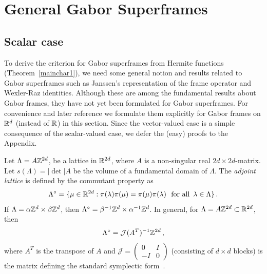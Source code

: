 \documentclass[12pt]{amsart}
\begin{document}
\section{General Gabor Superframes}
 


  \subsection{Scalar case}

To derive the criterion for Gabor superframes from Hermite  functions
(Theorem~\ref{mainchar1}), we need some general notion and results 
related  to  Gabor superframes
such as  Janssen's  representation of the frame operator and  Wexler-Raz
identities.  Although these are among the fundamental  
results about Gabor frames, they have not yet been formulated  for
Gabor superframes. For convenience and  later reference we formulate
them explicitly for Gabor frames on $\mathbb{R} ^d $ (instead of $\mathbb{R} $) in this 
section. Since the vector-valued case is   a simple consequence of the
scalar-valued case, we defer the (easy) proofs to the Appendix.  

\medskip
 
Let $\Lambda = A \mathbb{Z} ^{2d}$,  be a lattice in $\mathbb{R} ^{2d}$, where $A$
is a non-singular real  $2d \times 2d$-matrix. Let $s(\Lambda )
= |\det| A$ be  the volume of a fundamental domain of $\Lambda$.
The  {\em adjoint lattice} is defined by the commutant property  as 
\begin{equation}
  \label{eq:c2}
  \Lambda ^\circ = \{ \mu \in \mathbb{R} ^{2d}: \pi (\lambda ) \pi (\mu ) =
  \pi (\mu ) \pi (\lambda ) \,\, \text{ for all } \, \lambda \in
  \Lambda \}\, .
\end{equation}
 If $\Lambda = \alpha \mathbb{Z} ^d \times \beta \mathbb{Z} ^d$, then $\Lambda
^\circ = \beta ^{-1} \mathbb{Z} ^d \times \alpha ^{-1} \mathbb{Z} ^d$. In general, for
$\Lambda = A \mathbb{Z} ^{2d}\subset \mathbb{R}^{2d}$, then
\begin{equation}
  \label{eq:cn1}
  \Lambda ^\circ =
\mathcal{J}(A^T)^{-1} \mathbb{Z} ^{2d} \, ,
\end{equation}
 where $A^T $ is the transpose of $A$
and $\mathcal{J} =
\begin{pmatrix}
  0 & I \\ -I  & 0
\end{pmatrix}$ (consisting of $d\times d$ blocks) is the
matrix defining the standard symplectic
form~\cite{feichtinger-kozek98}. %
\end{document}
